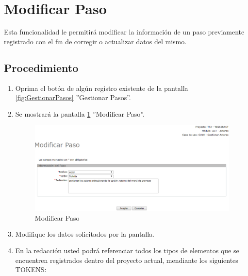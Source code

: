 \hypertarget{cv:modificarPaso}{\section{Modificar Paso}} \label{sec:modificarPaso}

	Esta funcionalidad le permitirá modificar la información de un paso previamente registrado con el fin de corregir o actualizar datos del mismo. 

		\subsection{Procedimiento}

			\begin{enumerate}
	
			\item Oprima el botón \IUEditar{} de algún registro existente de la pantalla \ref{fig:GestionarPasos} ''Gestionar Pasos''.
	
			\item Se mostrará la pantalla \ref{fig:modificarPaso} ''Modificar Paso''.
			
			\begin{figure}[htbp!]
				\begin{center}
					\includegraphics[scale=0.6]{roles/lider/casosUso/trayectorias/pasos/pantallas/IU6-1-1-1-2modificarPaso}
					\caption{Modificar Paso}
					\label{fig:modificarPaso}
				\end{center}
			\end{figure}
		
			\item Modifique los datos solicitados por la pantalla.
			
			\item En la redacción usted podrá referenciar todos los tipos de elementos que se encuentren registrados dentro del proyecto actual, mendiante los siguientes TOKENS:
			

\end{enumerate}
